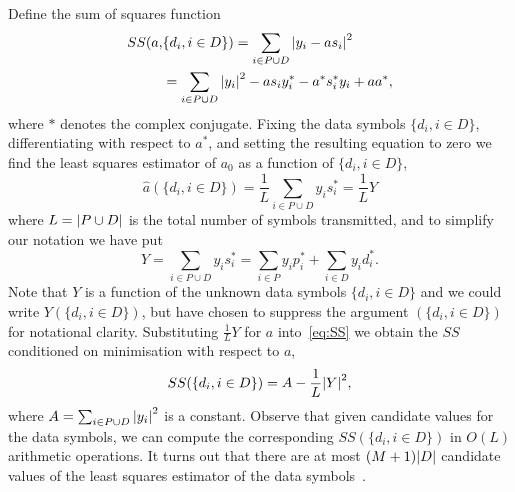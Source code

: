 \documentclass[journal]{IEEEtran}
\begin{document}
Define the sum of squares function
\begin{align}
SS(a, &\{d_i, i \in D\}) = \sum_{i \in P \cup D} {\left\vert  y_i - a s_i  \right\vert}^2 \nonumber \\
&= \sum_{i \in P \cup D} {\left\vert y_i \right\vert}^2 - a s_i y_i^* - a^* s_i^* y_i + aa^*, \label{eq:SS}
\end{align}
where $*$ denotes the complex conjugate.  Fixing the data symbols $\{d_i, i \in D\}$, differentiating with respect to $a^*$, and setting the resulting equation to zero we find the least squares estimator of $a_0$ as a function of $\{d_i, i \in D\}$,
\begin{equation}\label{eq:hata}
\hat{a}(\{d_i, i \in D\}) = \frac{1}{L} \sum_{i \in P \cup D} y_i s_i^* = \frac{1}{L} Y
\end{equation}
where $L = {\left\vert P \cup D \right\vert}$ is the total number of symbols transmitted, and to simplify our notation we have put 
\[
Y = \sum_{i \in P \cup D} y_i s_i^* = \sum_{i \in P } y_i p_i^* + \sum_{i \in D } y_i d_i^*.
\]  
Note that $Y$ is a function of the unknown data symbols $\{ d_i, i \in D\}$ and we could write $Y(\{ d_i, i \in D\})$, but have chosen to suppress the argument $(\{ d_i, i \in D\})$ for notational clarity.  Substituting $\frac{1}{L}Y$ for $a$ into~\eqref{eq:SS} we obtain the $SS$ conditioned on minimisation with respect to $a$,
\begin{equation}\label{eq:SSdatasymbols}
SS(\{d_i, i \in D\}) = A - \frac{1}{L}{\left\vert Y \right\vert}^2,
\end{equation}
where $A = \sum_{i \in P \cup D}{\left\vert y_i \right\vert}^2$ is a constant.  Observe that given candidate values for the data symbols, we can compute the corresponding $SS(\{d_i, i \in D\})$ in $O(L)$ arithmetic operations.  It turns out that there are at most $(M+1){\left\vert D \right\vert}$ candidate values of the least squares estimator of the data symbols~\cite{Sweldens2001,Mackenthun1994}.  %
\end{document}
